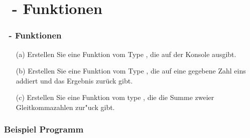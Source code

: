 \def\stitle{\theexercise\ - Funktionen}
\section{\stitle}

\begin{frame}[t]%
    \frametitle{\stitle}
\medskip
\begin{itemize}
\item[(a)] Erstellen Sie eine Funktion vom Type , die  auf der Konsole ausgibt.
\item[(b)] Erstellen Sie eine Funktion vom Type , die auf eine gegebene Zahl eins addiert und das Ergebnis zur\"uck gibt.
\item[(c)] Erstellen Sie eine Funktion vom type , die die Summe zweier Gleitkommazahlen zur"uck gibt.
\end{itemize}
\end{frame}

\begin{frame}[fragile]%
  \frametitle{Beispiel Programm}%
\medskip


\end{frame}
